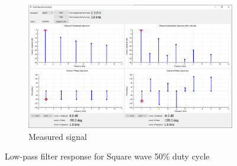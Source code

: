 \documentclass[notitlepage, a4paper, 11pt]{article}
\begin{document}
\begin{figure}[H]
\begin{subfigure}[][][t]{0.45\textwidth}
			\includegraphics[width=\textwidth, trim=10 80 10 100, clip]{../img/Circuit1/dut50}
			\caption{Measured signal}
		\end{subfigure}
		\caption{Low-pass filter response for Square wave 50\% duty cycle}
	\end{figure}
	
	
	
\end{document}
